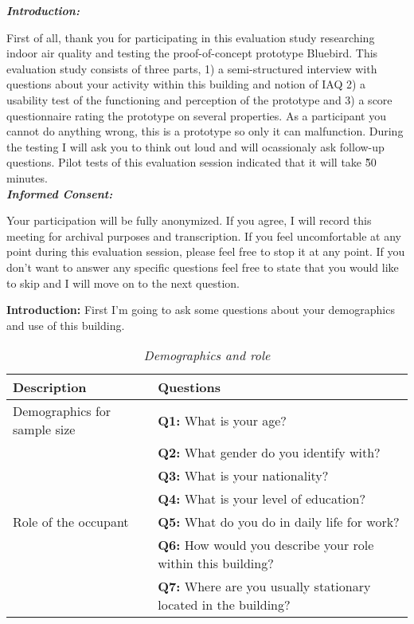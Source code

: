 \begin{appendices}
\textit{\textbf{Introduction:}}

First of all, thank you for participating in this evaluation study researching indoor air quality and testing the proof-of-concept prototype Bluebird. This evaluation study consists of three parts, 1) a semi-structured interview with questions about your activity within this building and notion of IAQ 2) a usability test of the functioning and perception of the prototype and 3) a score questionnaire rating the prototype on several properties. As a participant you cannot do anything wrong, this is a prototype so only it can malfunction. During the testing I will ask you to think out loud and will ocassionaly ask follow-up questions. Pilot tests of this evaluation session indicated that it will take \~50 minutes. \\

\textit{\textbf{Informed Consent:}}

Your participation will be fully anonymized. If you agree, I will record this meeting for archival purposes and transcription. If you feel uncomfortable at any point during this evaluation session, please feel free to stop it at any point. If you don't want to answer any specific questions feel free to state that you would like to skip and I will move on to the next question.

\begin{table}[htbp]
    \captionsetup{justification=raggedright,singlelinecheck=false}
    \caption{\textit{Demographics and role}}
    \label{tab:column_widths}
    \raggedright \textbf{Introduction:} First I'm going to ask some questions about your demographics and use of this building.
    \begin{tabularx}{\textwidth}{|p{}|X|}
        \hline
        \textbf{Description} & \textbf{Questions} \\
        \hline
        Demographics for sample size & \textbf{Q1:} What is your age? \\
        & \textbf{Q2:} What gender do you identify with? \\
        & \textbf{Q3:} What is your nationality? \\
        & \textbf{Q4:} What is your level of education? \\
        \hline
        Role of the occupant & 
        \textbf{Q5:} What do you do in daily life for work? \\
        & \textbf{Q6:} How would you describe your role within this building? \\
        & \textbf{Q7:} Where are you usually stationary located in the building? \\
        \hline
    \end{tabularx}
\end{table}


\end{appendices}
